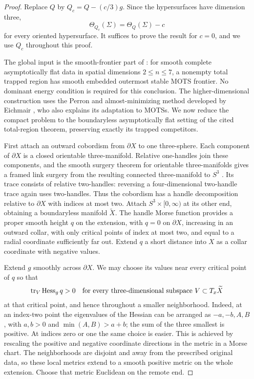 \begin{proof}
Replace $Q$ by $Q_c=Q-(c/3)g$.  Since the hypersurfaces have dimension three,
\begin{equation}\label{four:geo:threshold-shift}
 \Theta_{Q_c}(\Sigma)=\Theta_Q(\Sigma)-c
\end{equation}
for every oriented hypersurface.  It suffices to prove the result for
$c=0$, and we use $Q_c$ throughout this proof.

The global input is the smooth-frontier part of
\cite[Theorem~4.6]{AnderssonEichmairMetzger2011}: for smooth complete asymptotically flat data in
spatial dimensions $2\le n\le7$, a nonempty total trapped region has smooth
embedded outermost stable MOTS frontier.  No dominant energy condition is
required for this conclusion.  The higher-dimensional construction uses
the Perron and almost-minimizing method developed by Eichmair
\cite{Eichmair2010}, who also explains its adaptation to MOTSs.
We now reduce the compact problem to the boundaryless asymptotically flat
setting of the cited total-region theorem, preserving exactly its trapped
competitors.

First attach an outward cobordism from $\partial X$ to one three-sphere.
Each component of $\partial X$ is a closed orientable three-manifold.  Relative
one-handles join these components, and the smooth surgery theorem for
orientable three-manifolds gives a framed link surgery from the resulting
connected three-manifold to $S^3$
\cite[Theorem~6 and its proof, pp.~521--522]{Wallace1960}.
Its trace consists of
relative two-handles: reversing a four-dimensional two-handle trace again
uses two-handles.  Thus the cobordism has a handle decomposition relative to
$\partial X$ with indices at most two.  Attach $S^3\times[0,\infty)$ at its
other end, obtaining a boundaryless manifold $\widetilde X$.  The handle
Morse function provides a proper smooth height $q$
on the extension, with $q=0$ on $\partial X$, increasing in an outward
collar, with only critical points of index at most two, and equal to a radial
coordinate sufficiently far out.  Extend $q$ a short distance into $X$ as a
collar coordinate with negative values.

Extend $g$ smoothly across $\partial X$.  We may choose its values near every
critical point of $q$ so that
\begin{equation}\label{four:geo:morse-trace}
 \operatorname{tr}_V\operatorname{Hess}_g q>0
 \quad\text{for every three-dimensional subspace }V\subset T_x\widetilde X
\end{equation}
at that critical point, and hence throughout a smaller neighborhood.  Indeed,
at an index-two point the eigenvalues of the Hessian can be arranged as
$-a,-b,A,B$, with $a,b>0$ and $\min(A,B)>a+b$; the sum of the three smallest
is positive.  At indices zero or one the same choice is easier.  This is
achieved by rescaling the positive and negative coordinate directions in
the metric in a Morse chart.  The neighborhoods are disjoint and away from
the prescribed original data, so these local metrics extend to a smooth
positive metric on the whole extension.  Choose that metric Euclidean on
the remote end.


\end{proof}
